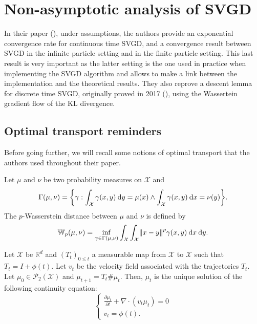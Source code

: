\documentclass[runningheads,a4paper]{llncs}
\newcommand{\R}{\mathbb{R}}
\newcommand{\E}{\mathbb{E}}
\newcommand{\X}{\mathcal{X}}
\renewcommand{\P}{\mathcal{P}}
\newcommand{\KL}{\mathrm{KL}}
\newcommand{\W}{\mathbb{W}}
\newcommand{\diff}[2]{\frac{\partial #1}{\partial #2}}
\renewcommand{\d}{\: \mathrm{d}}
\DeclarePairedDelimiter{\norm}{\|}{\|}
\DeclarePairedDelimiter{\bra}{\{}{\}}
\begin{document}

\section{Non-asymptotic analysis of SVGD}
In their paper (\cite{main-paper}), under assumptions, the authors provide
an exponential convergence rate for continuous time SVGD, and
a convergence result between SVGD in the infinite particle setting
and in the finite particle setting.
This last result is very important as the latter
setting is the one used in practice
when implementing the SVGD algorithm and allows to
make a link between the implementation and the theoretical
results.
They also reprove a descent lemma for discrete time SVGD, originally
proved in 2017 (\cite{SVGD-flow}), using the Wassertein gradient
flow of the $\KL$ divergence.


\subsection{Optimal transport reminders}
Before going further, we will recall some notions of optimal transport
that the authors used throughout their paper.\\

\begin{definition}
  Let $\mu$ and $\nu$ be two probability measures on $\X$ and
  $$
    \Gamma (\mu, \nu) = \bra*{\gamma : \int_\X \gamma(x, y) \d y = \mu(x)
    \land \int_\X \gamma(x, y) \d x = \nu(y)}.
  $$
  The $p$-Wasserstein distance between $\mu$ and $\nu$ is defined by
  $$
    \W_p(\mu, \nu) = \inf_{\gamma \in \Gamma(\mu, \nu)} \int_\X \int_\X
    \norm*{x-y}^p \gamma(x, y) \d x \d y.
  $$
\end{definition}

\begin{definition}\label{def:continuity-equation}
  Let $\X$ be $\R^d$ and $(T_t)_{0 \leq t}$ a measurable map from $\X$ to $\X$
  such that $T_t = I + \phi(t)$.
  Let $v_t$ be the velocity field associated 
  with the trajectories $T_t$. Let $\mu_0 \in \P_2(\X)$
  and $\mu_{t+1} = T_t \# \mu_t$. Then, $\mu_t$ is the unique solution
  of the following continuity equation:
  $$
  \begin{cases}
    \diff{\mu_t}{t} + \nabla \cdot (v_t \mu_t) = 0 \\
    v_t = \phi(t).
  \end{cases}
  $$
  
\end{definition}
\end{document}
